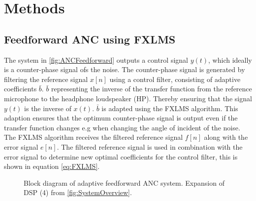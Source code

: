\section{Methods} \label{sec:methods}
\subsection{Feedforward ANC using FXLMS}


The system in \autoref{fig:ANCFeedforward} outputs a control signal $y(t)$, which ideally is a counter-phase signal ofs the noise. The counter-phase signal is generated by filtering the reference signal $x[n]$ using a control filter, consisting of adaptive coefficients $\bar{b}$. $\bar{b}$ representing the inverse of the transfer function from the reference microphone to the headphone loudspeaker (HP). Thereby ensuring that the signal $y(t)$ is the inverse of $x(t)$. $\bar{b}$ is adapted using the FXLMS algorithm. This adaption ensures that the optimum counter-phase signal is output even if the transfer function changes e.g when changing the angle of incident of the noise. The FXLMS algorithm receives the filtered reference signal $f[n]$ along with the error signal $e[n]$. The filtered reference signal is used in combination with the error signal to determine new optimal coefficients for the control filter, this is shown in equation \ref{eq:FXLMS}. 



\begin{figure}[H]
	\centering
		
	\caption{Block diagram of adaptive feedforward ANC system. Expansion of DSP (4) from \autoref{fig:SystemOverview}.}
	\label{fig:ANCFeedforward}
\end{figure}



